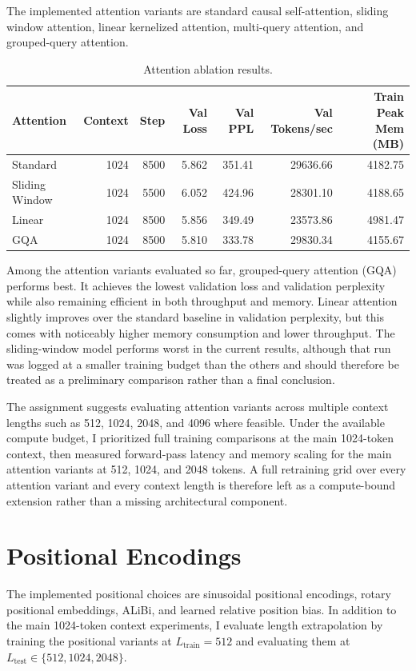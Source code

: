 \documentclass{article}
\begin{document}
The implemented attention variants are standard causal self-attention, sliding
window attention, linear kernelized attention, multi-query attention, and
grouped-query attention.

\begin{table}[h]
\centering
\begin{tabular}{lrrrrrr}
\toprule
Attention & Context & Step & Val Loss & Val PPL & Val Tokens/sec & Train Peak Mem (MB) \\
\midrule
Standard & 1024 & 8500 & 5.862 & 351.41 & 29636.66 & 4182.75 \\
Sliding Window & 1024 & 5500 & 6.052 & 424.96 & 28301.10 & 4188.65 \\
Linear & 1024 & 8500 & 5.856 & 349.49 & 23573.86 & 4981.47 \\
GQA & 1024 & 8500 & 5.810 & 333.78 & 29830.34 & 4155.67 \\
\bottomrule
\end{tabular}
\caption{Attention ablation results.}
\end{table}

Among the attention variants evaluated so far, grouped-query attention (GQA)
performs best. It achieves the lowest validation loss and validation perplexity
while also remaining efficient in both throughput and memory. Linear attention
slightly improves over the standard baseline in validation perplexity, but this
comes with noticeably higher memory consumption and lower throughput. The
sliding-window model performs worst in the current results, although that run
was logged at a smaller training budget than the others and should therefore be
treated as a preliminary comparison rather than a final conclusion.

The assignment suggests evaluating attention variants across multiple context
lengths such as 512, 1024, 2048, and 4096 where feasible. Under the available
compute budget, I prioritized full training comparisons at the main 1024-token
context, then measured forward-pass latency and memory scaling for the main
attention variants at 512, 1024, and 2048 tokens. A full retraining grid over
every attention variant and every context length is therefore left as a
compute-bound extension rather than a missing architectural component.

\section{Positional Encodings}

The implemented positional choices are sinusoidal positional encodings, rotary
positional embeddings, ALiBi, and learned relative position bias. In addition
to the main 1024-token context experiments, I evaluate length extrapolation by
training the positional variants at $L_{\mathrm{train}}=512$ and evaluating them
at $L_{\mathrm{test}}\in\{512,1024,2048\}$.
\end{document}
